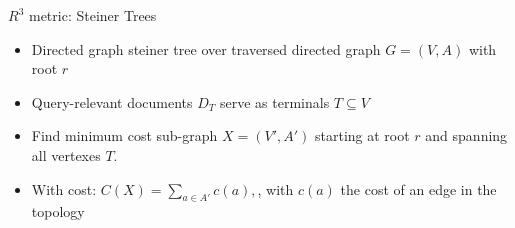 \begin{frame}{$R^{3}$ metric: Steiner Trees}
    \begin{itemize}
        \item Directed graph steiner tree over traversed directed graph $G = (V, A)$ with root $r$
        \item Query-relevant documents $D_{T}$ serve as terminals $T \subseteq V$
        \item Find minimum cost sub-graph $X = (V', A')$ starting at root $r$ and spanning all vertexes $T$.
        \item With cost: $ C(X) = \sum\nolimits_{a \in A'} c(a), $, with $c(a)$ the cost of an edge in the topology
    \end{itemize}
\end{frame}

